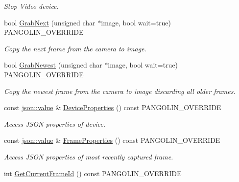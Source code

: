 \begin{DoxyCompactItemize}
\begin{DoxyCompactList}\small\item\em Stop Video device. \end{DoxyCompactList}\item 
bool \hyperlink{classpangolin_1_1_pango_video_abd49b114ac38554bbf29f4baa2d145ea}{Grab\+Next} (unsigned char $\ast$image, bool wait=true) P\+A\+N\+G\+O\+L\+I\+N\+\_\+\+O\+V\+E\+R\+R\+I\+DE
\begin{DoxyCompactList}\small\item\em Copy the next frame from the camera to image. \end{DoxyCompactList}\item 
bool \hyperlink{classpangolin_1_1_pango_video_a4968ca84a65d97cb87c5df1508d53655}{Grab\+Newest} (unsigned char $\ast$image, bool wait=true) P\+A\+N\+G\+O\+L\+I\+N\+\_\+\+O\+V\+E\+R\+R\+I\+DE
\begin{DoxyCompactList}\small\item\em Copy the newest frame from the camera to image discarding all older frames. \end{DoxyCompactList}\item 
const \hyperlink{classpangolin_1_1json_1_1value}{json\+::value} \& \hyperlink{classpangolin_1_1_pango_video_aeb10784316444180dacf7785dfa11784}{Device\+Properties} () const P\+A\+N\+G\+O\+L\+I\+N\+\_\+\+O\+V\+E\+R\+R\+I\+DE\hypertarget{classpangolin_1_1_pango_video_aeb10784316444180dacf7785dfa11784}{}\label{classpangolin_1_1_pango_video_aeb10784316444180dacf7785dfa11784}

\begin{DoxyCompactList}\small\item\em Access J\+S\+ON properties of device. \end{DoxyCompactList}\item 
const \hyperlink{classpangolin_1_1json_1_1value}{json\+::value} \& \hyperlink{classpangolin_1_1_pango_video_a1681ce549af0437857b0741c1161f420}{Frame\+Properties} () const P\+A\+N\+G\+O\+L\+I\+N\+\_\+\+O\+V\+E\+R\+R\+I\+DE\hypertarget{classpangolin_1_1_pango_video_a1681ce549af0437857b0741c1161f420}{}\label{classpangolin_1_1_pango_video_a1681ce549af0437857b0741c1161f420}

\begin{DoxyCompactList}\small\item\em Access J\+S\+ON properties of most recently captured frame. \end{DoxyCompactList}\item 
int \hyperlink{classpangolin_1_1_pango_video_a02cf8a9313c3826fdcf1e299ee8b9013}{Get\+Current\+Frame\+Id} () const P\+A\+N\+G\+O\+L\+I\+N\+\_\+\+O\+V\+E\+R\+R\+I\+DE\hypertarget{classpangolin_1_1_pango_video_a02cf8a9313c3826fdcf1e299ee8b9013}{}\label{classpangolin_1_1_pango_video_a02cf8a9313c3826fdcf1e299ee8b9013}


\end{DoxyCompactItemize}
